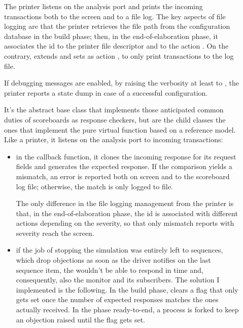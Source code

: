 \begin{description} 
    \item[] The printer listens on the analysis port and prints the incoming transactions both to the screen and to a file log. 
    The key aspects of file logging are that the printer retrieves the file path from the configuration database in the build phase; then, in the end-of-elaboration phase, it associates the id  to the printer file descriptor and to the action . On the contrary,  extends  and sets as action , to only print transactions to the log file.

    If debugging messages are enabled, by raising the verbosity at least to , the printer reports a state dump in case of a successful configuration.
    
    \item[] It's the abstract base class that implements those anticipated common duties of scoreboards as response checkers, but are the child classes the ones that implement the pure virtual function  based on a reference model. Like a printer, it listens on the analysis port to incoming transactions: 
    \begin{itemize}
        \item in the  callback function, it clones the incoming \dut response for its request fields and generates the expected response. If the comparison yields a mismatch, an error is reported both on screen and to the scoreboard log file; otherwise, the match is only logged to file. 

        The only difference in the file logging management from the printer is that, in the end-of-elaboration phase, the id  is associated with different actions depending on the severity, so that only mismatch reports with severity  reach the screen.

        \item if the job of stopping the simulation was entirely left to sequences, which drop objections as soon as the driver notifies  on the last sequence item, the \dut wouldn't be able to respond in time and, consequently, also the monitor and its subscribers. The solution I implemented is the following. In the build phase,  clears a flag that only gets set once the number of expected responses matches the ones actually received. In the phase ready-to-end, a process is forked to keep an objection raised until the flag gets set.
    \end{itemize}  
    

\end{description}
